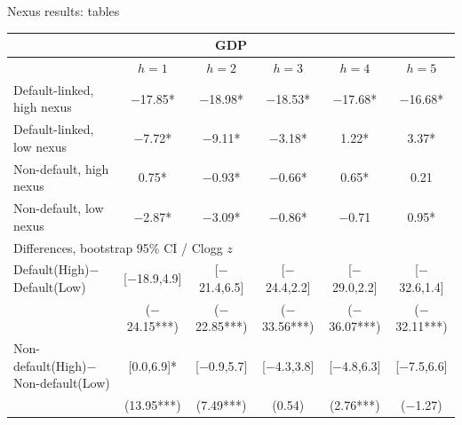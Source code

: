 \documentclass[aspectratio=169]{beamer}
\begin{document}
\begin{frame}{Nexus results: tables}
  \tiny
  \begin{center}
  \begin{tabular*}{0.92\linewidth}{@{\extracolsep{\fill}}lccccc}
  \multicolumn{6}{c}{\normalsize GDP} \\
  \toprule
   & $h=1$ & $h=2$ & $h=3$ & $h=4$ & $h=5$ \\
  \midrule
  Default-linked, high nexus & $-$17.85* & $-$18.98* & $-$18.53* & $-$17.68* & $-$16.68* \\
  Default-linked, low nexus & $-$7.72* & $-$9.11* & $-$3.18* & 1.22* & 3.37* \\
  Non-default, high nexus & 0.75* & $-$0.93* & $-$0.66* & 0.65* & 0.21 \\
  Non-default, low nexus & $-$2.87* & $-$3.09* & $-$0.86* & $-$0.71 & 0.95* \\
  \midrule
  \multicolumn{6}{l}{Differences, bootstrap 95\% CI / Clogg $z$} \\[1pt]
  Default(High)$-$Default(Low) & [$-$18.9,4.9] & [$-$21.4,6.5] & [$-$24.4,2.2] & [$-$29.0,2.2] & [$-$32.6,1.4] \\
   & ($-$24.15***) & ($-$22.85***) & ($-$33.56***) & ($-$36.07***) & ($-$32.11***) \\[2pt]
  Non-default(High)$-$Non-default(Low) & [0.0,6.9]* & [$-$0.9,5.7] & [$-$4.3,3.8] & [$-$4.8,6.3] & [$-$7.5,6.6] \\
   & (13.95***) & (7.49***) & (0.54) & (2.76***) & ($-$1.27) \\
  \bottomrule
  \end{tabular*}
  \end{center}
\end{frame}
\end{document}
